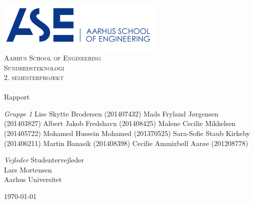\begin{titlingpage}
\begin{center}

~ \\[3cm]

\includegraphics[width=0.6\textwidth]{figurer/ASE}~\\[1cm]

\textsc{\LARGE Aarhus School of Engineering}\\[1.5cm]

\textsc{\Large Sundhedsteknologi}\\
\textsc{\Large 2. semesterprojekt}\\[0.5cm]

\noindent\makebox[\linewidth]{\rule{\textwidth}{0.4pt}}\\
[0.5cm]{\Huge Rapport}
\noindent\makebox[\linewidth]{\rule{\textwidth}{0.4pt}}

\end{center}

\textit{Gruppe 1} \newline
Lise Skytte Brodersen (201407432) \newline
Mads Fryland J\o rgensen (201403827) \newline
Albert Jakob Fredshavn (201408425) \newline
Malene Cecilie Mikkelsen (201405722) \newline		 
Mohamed Hussein Mohamed (201370525) \newline 
Sara-Sofie Staub Kirkeby (201406211) \newline
Martin Banasik (201408398) \newline
Cecilie Ammizb\o ll Aar\o e (201208778) \newline 


\textit{Vejleder} \newline
Studentervejleder\\
Lars Mortensen\\
Aarhus Universitet


\vfill

\begin{center}
{\large \today}
\end{center}


\end{titlingpage}